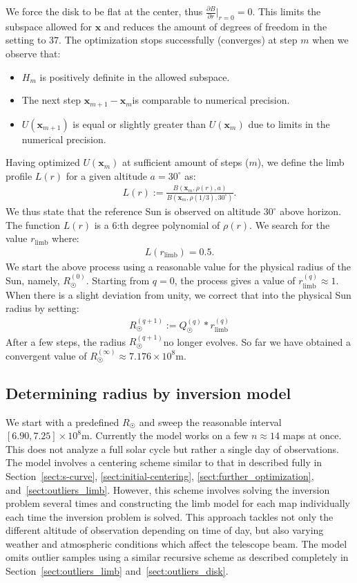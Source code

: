\documentclass{aa}
\newcommand{\eqnl}[2]{\begin{eqnarray}\label{#1}#2\end{eqnarray}}
\newcommand{\s}[2]{{#1}_{\mathrm{#2}}}
\begin{document}
  We force the disk to be flat at the center, thus $\frac{\partial B}{\partial r}\big|_{r=0} = 0$. This limits the 
  subspace allowed for $\bm{x}$ and reduces the amount of degrees of freedom in the setting to $37$. The optimization stops successfully (converges) at step $m$ when we observe that:
  \begin{itemize}
  \item $H_m$ is positively definite in the allowed subspace.
  \item The next step $\bm{x}_{m+1} - \bm{x}_{m}$is comparable to numerical precision.
  \item $U(\bm{x}_{m+1})$ is equal or slightly greater than $U(\bm{x}_m)$ due to limits in the numerical precision.
  \end{itemize}

  Having optimized $U(\bm{x}_{m})$ at sufficient amount of steps ($m$), we define the limb profile $L(r)$ for a given altitude $a = 30^{\circ}$ as:
  \eqnl{physical_radius_limb}{
  L(r) := \frac{B(\bm{x}_m, \rho(r), a)}{B(\bm{x}_m, \rho(1/3), 30^{\circ})} \text{.}
  }
  We thus state that the reference Sun is observed on altitude $30^{\circ}$ above horizon. The function $L(r)$ is a $6$:th degree polynomial of $\rho(r)$. We search for the value $\s{r}{limb}$ where:
  \eqnl{physical_radius_limb2}{
  L(\s{r}{limb}) = 0.5 \text{.}
  }
  We start the above process using a reasonable value for the physical radius of the Sun, namely, $R_{\astrosun}^{(0)}$. 
  Starting from $q=0$, the process gives a value of $\s{r}{limb}^{(q)} \approx 1$. When there is a slight deviation from 
  unity, we correct that into the physical Sun radius by setting:
  \eqnl{physical_radius_iteration}{
  R_{\astrosun}^{(q+1)} := Q_{\astrosun}^{(q)} * \s{r}{limb}^{(q)}
  }
  After a few steps, the radius $R_{\astrosun}^{(q+1)}$no longer evolves. So far we have obtained a convergent value of $R_{\astrosun}^{(\infty)} \approx 7.176 \times 10^8 \mathrm{m}$.

  \subsection{Determining radius by inversion model} \label{sect:radius_method2}

  We start with a predefined $R_{\astrosun}$ and sweep the reasonable interval $[6.90, 7.25] \times 10^8 \mathrm{m}$. 
  Currently the model works on a few $n \approx 14$ maps at once. This does not analyze a full solar cycle but rather a 
  single day of observations. The model involves a centering scheme similar to that in described fully in 
  Section~\ref{sect:s-curve}, \ref{sect:initial-centering}, \ref{sect:further_optimization}, and~\ref{sect:outliers_limb}. However, this 
  scheme involves solving the inversion problem several times and constructing the limb model for each map individually 
  each time the inversion problem is solved. This approach tackles not only the different altitude of observation 
  depending on time of day, but also varying weather and atmospheric conditions which affect the telescope beam. The 
  model omits outlier samples using a similar recursive scheme as described completely in 
  Section~\ref{sect:outliers_limb} and~\ref{sect:outliers_disk}.
\end{document}
